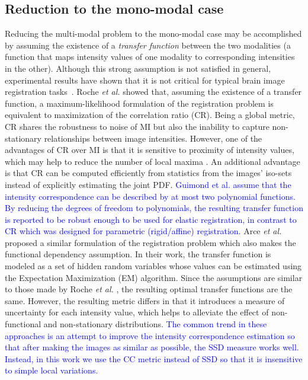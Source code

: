 \vspace{-0.2cm}
\subsection{Reduction to the mono-modal case}
Reducing the multi-modal problem to the mono-modal case may be accomplished by assuming the existence of a {\it transfer function} between the two modalities (a function that maps intensity values of one modality to corresponding intensities in the other). Although this strong assumption is not satisfied in general, experimental results have shown that it is not critical for typical brain image registration tasks~\cite{Roche1998}. Roche {\it et al.} \cite{Roche2000} showed that, assuming the existence of a transfer function, a maximum-likelihood formulation of the registration problem is equivalent to maximization of the correlation ratio (CR). Being a global metric, CR shares the robustness to noise of MI but also the inability to capture non-stationary relationships between image intensities. However, one of the advantages of CR over MI is that it is sensitive to proximity of intensity values, which may help to reduce the number of local maxima \cite{Roche1998}. An additional advantage is that CR can be computed efficiently from statistics from the images' iso-sets instead of explicitly estimating the joint PDF. \textcolor{blue}{ Guimond et al. \cite{Guimond2001} assume that the intensity correspondence can be described by at most two polynomial functions. By reducing the degrees of freedom to polynomials, the resulting transfer function is reported to be robust enough to be used for elastic registration, in contrast to CR which was designed for parametric (rigid/affine) registration.} Arce {\it et al.} \cite{Arce-santana2014} proposed a similar formulation of the registration problem which also makes the functional dependency assumption. In their work, the transfer function is modeled as a set of hidden random variables whose values can be estimated using the Expectation Maximization (EM) algorithm. Since the assumptions are similar to those made by Roche {\it et al.} \cite{Roche1998, Roche2000}, the resulting optimal transfer functions are the same. However, the resulting metric differs in that it introduces a measure of uncertainty for each intensity value, which helps to alleviate the effect of non-functional and non-stationary distributions. \textcolor{blue}{ The common trend in these approaches is an attempt to improve the intensity correspondence estimation so that after making the images as similar as possible, the SSD measure works well. Instead, in this work we use the CC metric instead of SSD so that it is insensitive to simple local variations.}\\

